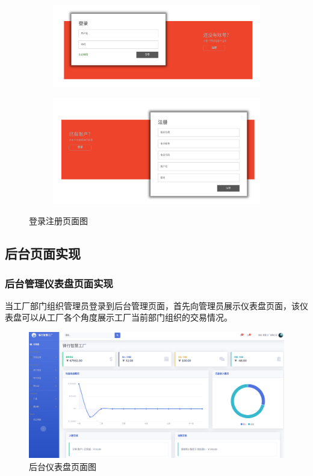 \begin{figure}[H]
    \centering
    \begin{subfigure}{.45\textwidth}
        \centering
        \includegraphics[width=\textwidth]{figures/5login.png}
        \label{fig:loginpage}
    \end{subfigure}
    \qquad
    \begin{subfigure}{.45\textwidth}
        \centering
        \includegraphics[width=\textwidth]{figures/5register.png}
        \label{fig:register}
    \end{subfigure}
    \caption{登录注册页面图}
\end{figure}

\subsection{后台页面实现}

\subsubsection{后台管理仪表盘页面实现}

当工厂部门组织管理员登录到后台管理页面，首先向管理员展示仪表盘页面，该仪表盘可以从工厂各个角度展示工厂当前部门组织的交易情况。

\begin{figure}[H]
    \centering
    \includegraphics[width=.75\textwidth]{figures/5dashboard.png}
    \caption{后台仪表盘页面图}
    \label{fig:dashboard}
\end{figure}

